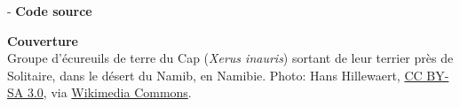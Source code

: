\begin{adjustwidth*}{\unitlength}{-\unitlength}
  \textbf{Code source} \\
  \viewsource{\ghurl}



  \textbf{Couverture} \\
  Groupe d'écureuils de terre du Cap (\emph{Xerus inauris}) sortant de
  leur terrier près de Solitaire, dans le désert du Namib, en Namibie.
  Photo: {\textcopyright} Hans Hillewaert, \href{http://creativecommons.org/licenses/by-sa/3.0/deed.fr}{CC BY-SA 3.0}, via
  \href{https://commons.wikimedia.org/w/index.php?curid=2429056}{Wikimedia Commons}.
\end{adjustwidth*}
\endgroup

